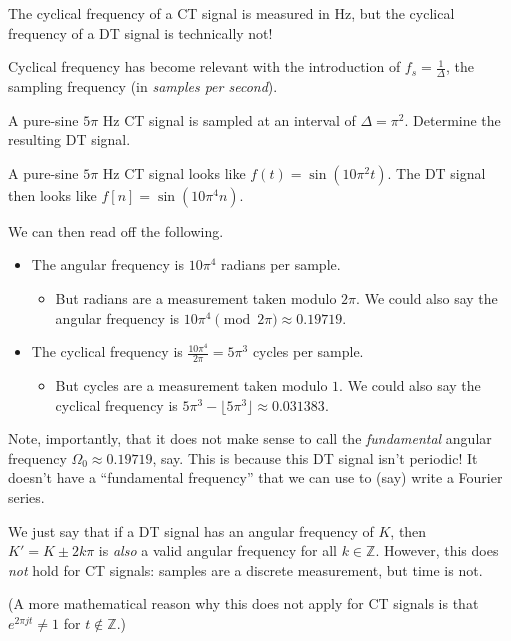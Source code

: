 \begin{remark}
    The cyclical frequency of a CT signal is measured in Hz,
    but the cyclical frequency of a DT signal is technically not!
\end{remark}

Cyclical frequency has become relevant with the introduction of $f_s = \frac{1}{\Delta}$,
the sampling frequency (in \emph{samples per second}).

\begin{problem}
    A pure-sine $5\pi$ Hz CT signal is sampled at an interval of $\Delta = \pi^2$.
    Determine the resulting DT signal.
\end{problem}

\begin{solution}
    A pure-sine $5\pi$ Hz CT signal looks like $f(t) = \sin(10\pi^2 t)$.
    The DT signal then looks like $f[n] = \sin(10 \pi^4 n)$.

    We can then read off the following.
    \begin{itemize}
        \item The angular frequency is $10\pi^4$ radians per sample.
        \begin{itemize}
            \item But radians are a measurement taken modulo $2\pi$.
            We could also say the angular frequency is
            $10\pi^4 \pmod{2\pi} \approx 0.19719$.
        \end{itemize}
        \item The cyclical frequency is $\frac{10\pi^4}{2\pi} = 5\pi^3$ cycles per sample.
        \begin{itemize}
            \item But cycles are a measurement taken modulo $1$.
            We could also say the cyclical frequency is
            $5\pi^3 - \lfloor 5\pi^3 \rfloor \approx 0.031383$.
        \end{itemize}
    \end{itemize}
    Note, importantly, that it does not make sense to call the \emph{fundamental} angular frequency
    $\Omega_0 \approx 0.19719$, say.  This is because this DT signal isn't periodic!  It doesn't have
    a ``fundamental frequency'' that we can use to (say) write a Fourier series.
\end{solution}

\begin{remark}
    We just say that if a DT signal has an angular frequency of $K$,
    then $K' = K \pm 2k \pi$ is \emph{also} a valid angular frequency
    for all $k \in \mathbb{Z}$.  However, this does \emph{not} hold for CT signals:
    samples are a discrete measurement, but time is not.

    (A more mathematical reason why this does not apply for CT signals
    is that $e^{2\pi j t} \neq 1$ for $t \not \in \mathbb{Z}$.)
\end{remark}

